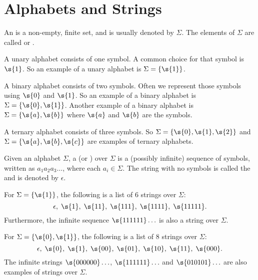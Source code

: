 \section{Alphabets and Strings}
\label{section:Alphabets-and-Strings}
\begin{flex}
\begin{definition} \label{definition:Alphabet-symbol-character}
An  is a non-empty, finite set, and is usually denoted by $\Sigma$. 
The elements of $\Sigma$ are called  or .
\end{definition}
\begin{example} \label{example:Unary-alphabet}
A unary alphabet consists of one symbol. A common choice for that symbol is $\s{1}$. 
So an example of a unary alphabet is $\Sigma = \{\s{1}\}$.
\end{example}
\begin{example} \label{example:Binary-alphabet}
A binary alphabet consists of two symbols. 
Often we represent those symbols using $\s{0}$ and $\s{1}$. 
So an example of a binary alphabet is $\Sigma = \{\s{0},\s{1}\}$.
Another example of a binary alphabet is $\Sigma=\{\s{a},\s{b}\}$ where $\s{a}$ and $\s{b}$ are the symbols.
\end{example}
\begin{example} \label{example:Ternary-alphabet}
A ternary alphabet consists of three symbols. 
So $\Sigma=\{\s{0},\s{1},\s{2}\}$ and $\Sigma=\{\s{a},\s{b},\s{c}\}$ are examples of ternary alphabets. 
\end{example}
\end{flex}
\begin{flex}
\begin{definition} \label{definition:String-word-empty-string}
Given an alphabet $\Sigma$, a  (or ) over $\Sigma$ is a (possibly infinite) sequence of symbols, written as $a_1a_2a_3\ldots$, where each $a_i \in \Sigma$. 
The string with no symbols is called the  and is denoted by $\epsilon$.
\end{definition}
\begin{example} \label{example:Strings-over-the-unary-alphabet}
For $\Sigma = \{\s{1}\}$, the following is a list of 6 strings over $\Sigma$: 
\[
    \epsilon,\; \s{1},\; \s{11},\; \s{111},\; \s{1111},\; \s{11111}.
\]
Furthermore, the infinite sequence $\s{111111}\ldots$ is also a string over $\Sigma$.
\end{example}
\begin{example} \label{example:Strings-over-the-binary-alphabet}
For $\Sigma = \{\s{0},\s{1}\}$, the following is a list of 8 strings over $\Sigma$: 
\[
\epsilon,\; \s{0},\; \s{1},\; \s{00},\; \s{01},\; \s{10},\; \s{11},\; \s{000}.
\] 
The infinite strings $\s{000000}\ldots$, $\s{111111}\ldots$ and $\s{010101}\ldots$ are also examples of strings over $\Sigma$.
\end{example}
\end{flex}
